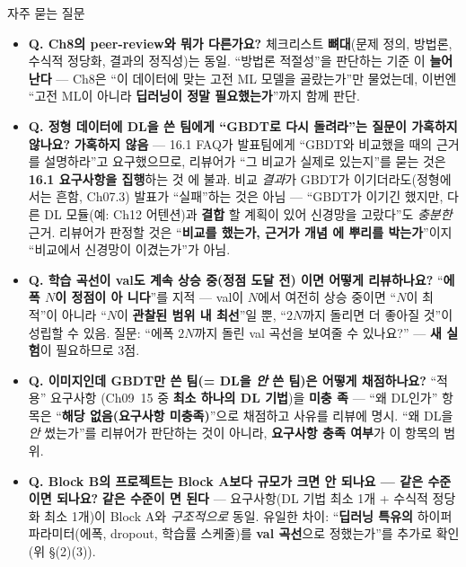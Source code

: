 \begin{frame}{자주 묻는 질문}
  \scriptsize
  \begin{itemize}
    \item \textbf{Q. Ch8의 peer-review와 뭐가 다른가요?} \;
      체크리스트 \textbf{뼈대}(문제 정의, 방법론, 수식적 정당화,
      결과의 정직성)는 동일. ``방법론 적절성''을 판단하는 기준
      이 \textbf{늘어난다} — Ch8은 ``이 데이터에 맞는 고전 ML
      모델을 골랐는가''만 물었는데, 이번엔 ``고전 ML이 아니라
      \textbf{딥러닝이 정말 필요했는가}''까지 함께 판단.
    \item \textbf{Q. 정형 데이터에 DL을 쓴 팀에게 ``GBDT로 다시
      돌려라''는 질문이 가혹하지 않나요?} \; \textbf{가혹하지
      않음} — 16.1 FAQ가 발표팀에게 ``GBDT와 비교했을 때의 근거를
      설명하라''고 요구했으므로, 리뷰어가 ``그 비교가 실제로
      있는지''를 묻는 것은 \textbf{16.1 요구사항을 집행}하는 것
      에 불과. 비교 \textit{결과}가 GBDT가 이기더라도(정형에서는
      흔함, Ch07.3) 발표가 ``실패''하는 것은 아님 — ``GBDT가
      이기긴 했지만, 다른 DL 모듈(예: Ch12 어텐션)과 \textbf{결합
      }할 계획이 있어 신경망을 고랐다''도 \textit{충분한} 근거.
      리뷰어가 판정할 것은 ``\textbf{비교를 했는가, 근거가 개념
      에 뿌리를 박는가}''이지 ``비교에서 신경망이 이겼는가''가
      아님.
    \item \textbf{Q. 학습 곡선이 val도 계속 상승 중(정점 도달 전)
      이면 어떻게 리뷰하나요?} \; ``\textbf{에폭 $N$이 정점이 아
      니다}''를 지적 — val이 $N$에서 여전히 상승 중이면 ``$N$이
      최적''이 아니라 ``$N$이 \textbf{관찰된 범위 내 최선}''일
      뿐, ``$2N$까지 돌리면 더 좋아질 것''이 성립할 수 있음. 질문:
      ``에폭 \textbf{$2N$}까지 돌린 val 곡선을 보여줄 수 있나요?''
      — \textbf{새 실험}이 필요하므로 3점.
    \item \textbf{Q. 이미지인데 GBDT만 쓴 팀(= DL을 \textit{안} 쓴
      팀)은 어떻게 채점하나요?}  ``적용'' 요구사항
      (Ch09~15 중 \textbf{최소 하나의 DL 기법})을 \textbf{미충
      족} — ``왜 DL인가'' 항목은 ``\textbf{해당 없음(요구사항
      미충족)}''으로 채점하고 사유를 리뷰에 명시. ``왜 DL을
      \textit{안} 썼는가''를 리뷰어가 판단하는 것이 아니라,
      \textbf{요구사항 충족 여부}가 이 항목의 범위.
    \item \textbf{Q. Block B의 프로젝트는 Block A보다 규모가 크면
      안 되나요 — 같은 수준이면 되나요?} \; \textbf{같은 수준이
      면 된다} — 요구사항(DL 기법 최소 1개 + 수식적 정당화 최소
      1개)이 Block A와 \textit{구조적으로} 동일. 유일한 차이:
      ``\textbf{딥러닝 특유의} 하이퍼파라미터(에폭, dropout,
      학습률 스케줄)를 \textbf{val 곡선}으로 정했는가''를 추가로
      확인(위 §(2)(3)).
  \end{itemize}
\end{frame}
